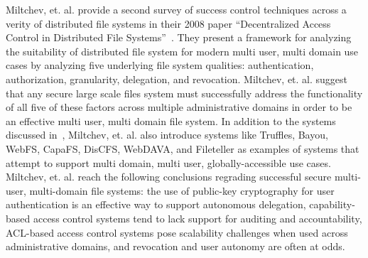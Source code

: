 \documentclass{sig-alternate}
\begin{document}
Miltchev, et. al. provide a second survey of success control
techniques across a verity of distributed file systems in their 2008
paper ``Decentralized Access Control in Distributed File
Systems''~\cite{Miltchev2008}. They present a framework for analyzing
the suitability of distributed file system for modern multi user,
multi domain use cases by analyzing five underlying file system
qualities: authentication, authorization, granularity, delegation, and
revocation.  Miltchev, et. al. suggest that any secure large scale
files system must successfully address the functionality of all five
of these factors across multiple administrative domains in order to be
an effective multi user, multi domain file system. In addition to the
systems discussed in~\cite{Kher2005}, Miltchev, et. al. also introduce
systems like Truffles, Bayou, WebFS, CapaFS, DisCFS, WebDAVA, and
Fileteller as examples of systems that attempt to support multi
domain, multi user, globally-accessible use cases. Miltchev,
et. al. reach the following conclusions regrading successful secure
multi-user, multi-domain file systems: the use of public-key
cryptography for user authentication is an effective way to support
autonomous delegation, capability-based access control systems tend to
lack support for auditing and accountability, ACL-based access control
systems pose scalability challenges when used across administrative
domains, and revocation and user autonomy are often at odds.
\end{document}
